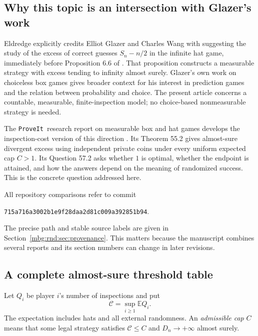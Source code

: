 \documentclass[11pt,letterpaper]{article}
\theoremstyle{definition}
\newcommand{\E}{\mathbb E}
\newcommand{\repo}{\texttt{ProveIt}}
\begin{document}
\subsection{Why this topic is an intersection with Glazer's work}

Eldredge explicitly credits Elliot Glazer and Charles Wang with
suggesting the study of the excess of correct guesses
$S_n-n/2$ in the infinite hat game, immediately before Proposition 6.6
of \cite{hat:Eldredge}. That proposition constructs a measurable strategy
with excess tending to infinity almost surely. Glazer's own work on
choiceless box games \cite{GlazerBox} gives broader context for his interest
in prediction games and the relation between probability and choice.
The present article concerns a countable, measurable, finite-inspection
model; no choice-based nonmeasurable strategy is needed.

The \repo\ research report on measurable box and hat games develops the
inspection-cost version of this direction \cite{rnd:ProveIt}. Its Theorem
55.2 gives almost-sure divergent excess using independent private coins
under every uniform expected cap $C>1$. Its Question 57.2 asks whether
$1$ is optimal, whether the endpoint is attained, and how the answers
depend on the meaning of randomized success. This is the concrete
question addressed here.

All repository comparisons refer to commit
\begin{center}
\texttt{715a716a3002b1e9f28daa2d81c009a392851b94}.
\end{center}
The precise path and stable source labels are given in
Section~\ref{mbg:rnd:sec:provenance}. This matters because the manuscript combines
several reports and its section numbers can change in later revisions.

\subsection{A complete almost-sure threshold table}

Let $Q_i$ be player $i$'s number of inspections and put
\begin{equation}
 \mathcal C=\sup_{i\ge1}\E Q_i.
 \label{mbg:rnd:eq:uniform-cost}
\end{equation}
The expectation includes hats and all external randomness. An
\emph{admissible cap} $C$ means that some legal strategy satisfies
$\mathcal C\le C$ and $D_n\to+\infty$ almost surely.
\end{document}
